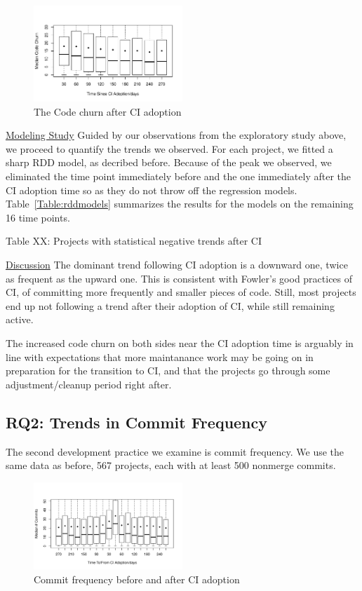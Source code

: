 \documentclass[conference]{IEEEtran}
\begin{document}
\begin{figure}[!t]
\centering
\includegraphics[width=0.5\textwidth]{churn_after.pdf}
\caption{The Code churn after CI adoption}
\label{Fig:CodeChurnAfter}
\end{figure}

\noindent \underline{Modeling Study} 
Guided by our observations from the exploratory study above, we proceed to quantify the trends we observed.
For each project, we fitted a sharp RDD model, as decribed before.
Because of the peak we observed, we eliminated the time point immediately before and the one immediately after the CI adoption time so as they do not throw off the regression models.
Table~\ref{Table:rddmodels} summarizes the results for the models on the remaining 16 time points.


Table XX: Projects with statistical negative trends after CI

\noindent \underline{Discussion}
The dominant trend following CI adoption is a downward one, twice as frequent as the upward one.
This is consistent with Fowler's good practices of CI, of committing more frequently and smaller pieces of code.
Still, most projects end up not following a trend after their adoption of CI, while still remaining active.


The increased code churn on both sides near the CI adoption time is arguably in line with expectations that more maintanance work may be going on in preparation for the transition to CI, and that the projects go through some adjustment/cleanup period right after.


\subsection{RQ2: Trends in Commit Frequency}

The second development practice we examine is commit frequency.
We use the same data as before, 567 projects, each with at least 500 nonmerge commits.

\begin{figure}[!t]
\centering
\includegraphics[width=0.5\textwidth]{numbercommits.pdf}
\caption{Commit frequency before and after CI adoption}
\label{Fig:NumberCommits}
\end{figure}
\end{document}
